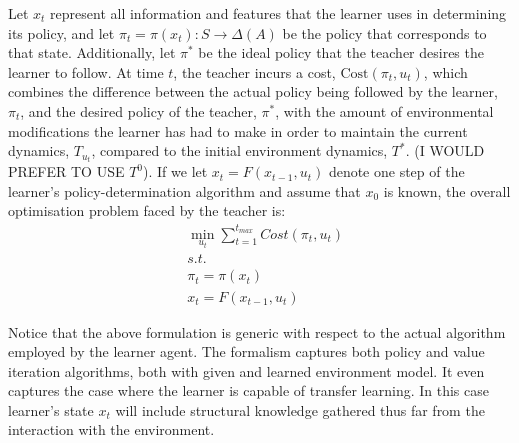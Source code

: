 \documentclass[letterpaper]{aamas2010}
\begin{document}
Let  $x_t$ represent all information and features that the learner uses in determining its policy, and 
let $\pi_t=\pi(x_t):S\rightarrow\Delta(A)$ be the policy that corresponds
to that state.  Additionally, let $\pi^*$ be the ideal policy that the teacher desires the learner to follow.  At time $t$, the teacher incurs a cost, $\mathrm{Cost}(\pi_t,u_t)$, which combines the difference between the actual policy being followed by the learner, $\pi_t$, and the desired policy of the teacher, $\pi^*$, with the amount of environmental modifications the learner has had to make in order to maintain the current dynamics, $T_{u_t}$, compared to the initial environment dynamics, $T^*$. (I WOULD PREFER TO USE $T^0$).  If we let $x_t=F(x_{t-1},u_t)$ denote one step of the learner's policy-determination algorithm and assume that $x_0$ is known, 
the overall optimisation problem faced by the teacher is:
\begin{eqnarray*}
&\min\limits_{u_t}\sum\limits_{t=1}^{t_{max}}Cost(\pi_t,u_t)\\
&s.t.\\
&\pi_t=\pi(x_t)\\
&x_t=F(x_{t-1},u_t)
\end{eqnarray*}




Notice that the above formulation is generic with respect to the
actual algorithm employed by the learner agent. The formalism captures
both policy and value iteration algorithms, both with given and
learned environment model. It even captures the case where the learner
is capable of transfer learning. In this case learner's state $x_t$
will include structural knowledge gathered thus far from the
interaction with the environment. 
\end{document}
